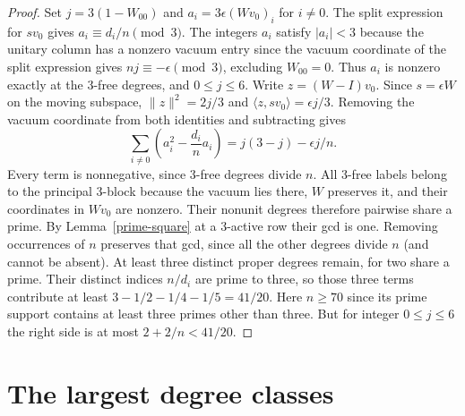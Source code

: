 \documentclass[11pt]{amsart}
\numberwithin{equation}{section}
\begin{document}
\begin{proof}
Set $j=3(1-W_{00})$ and $a_i=3\epsilon (Wv_0)_i$ for $i\ne0$.
The split expression for $s v_0$ gives $a_i\equiv d_i/n\pmod3$.
The integers $a_i$ satisfy $|a_i|<3$ because the unitary column has a
nonzero vacuum entry since the vacuum coordinate of the split
expression gives $n j\equiv-\epsilon\pmod3$, excluding $W_{00}=0$.
Thus $a_i$ is nonzero exactly at the 3-free degrees, and $0\le j\le6$.
Write $z=(W-I)v_0$. Since $s=\epsilon W$ on the moving subspace,
$\|z\|^2=2j/3$ and $\langle z,s v_0\rangle=\epsilon j/3$.
Removing the vacuum coordinate from both identities and subtracting
gives
\[
 \sum_{i\ne0}\left(a_i^2-\frac{d_i}{n}a_i\right)
                 =j(3-j)-\epsilon j/n .
\]
Every term is nonnegative, since 3-free degrees divide $n$.
All 3-free labels belong to the principal 3-block because the vacuum
lies there, $W$ preserves it, and their coordinates in $Wv_0$ are
nonzero. Their nonunit degrees therefore pairwise share a prime.
By Lemma~\ref{prime-square} at a 3-active row their gcd is one.
Removing occurrences of $n$ preserves that gcd, since all the other
degrees divide $n$ (and cannot be absent). At least three distinct
proper degrees remain, for two share a prime. Their distinct indices
$n/d_i$ are prime to three, so those three terms contribute at least
$3-1/2-1/4-1/5=41/20$. Here $n\ge70$ since its prime support
contains at least three primes other than three. But for integer
$0\le j\le6$ the right side is at most $2+2/n<41/20$.
\end{proof}

\section{The largest degree classes}
\end{document}
